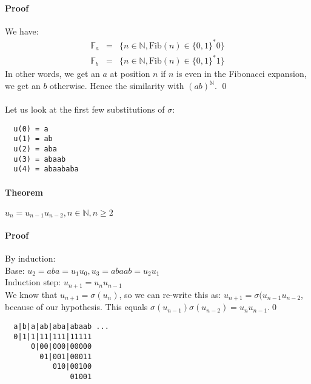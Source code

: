 \documentclass{article}
\begin{document}
\paragraph{Proof} We have:
\begin{eqnarray*}
  \mathbb{F}_a &=& \{n \in \mathbb{N}, \mathrm{Fib}(n) \in \{0, 1\}^* 0\}\\
  \mathbb{F}_b &=& \{n \in \mathbb{N}, \mathrm{Fib}(n) \in \{0, 1\}^* 1\}
\end{eqnarray*}
In other words, we get an $a$ at position $n$ if $n$ is even in the Fibonacci
expansion, we get an $b$ otherwise. Hence the similarity with 
$(ab)^{\mathbb{N}}$. \qed\\
\\
Let us look at the first few substitutions of $\sigma$:
\begin{verbatim}
  u(0) = a
  u(1) = ab
  u(2) = aba
  u(3) = abaab
  u(4) = abaababa
\end{verbatim}

\paragraph{Theorem} $u_n = u_{n - 1} u_{n - 2}, n \in \mathbb{N}, n \ge 2$
\paragraph{Proof} By induction: \\
Base: $u_2 = aba = u_1 u_0, u_3 = abaab = u_2 u_1$\\
Induction step: $u_{n + 1} = u_n u_{n - 1}$\\
We know that $u_{n + 1} = \sigma(u_n)$, so we can re-write this as:
$u_{n + 1} = \sigma(u_{n - 1} u_{n - 2}$, because of our hypothesis. This 
equals $\sigma(u_{n - 1}) \sigma(u_{n - 2}) = u_n u_{n - 1}$.\qed 
\begin{verbatim}
  a|b|a|ab|aba|abaab ...
  0|1|1|11|111|11111
      0|00|000|00000
        01|001|00011
           010|00100
               01001
\end{verbatim}
\end{document}

